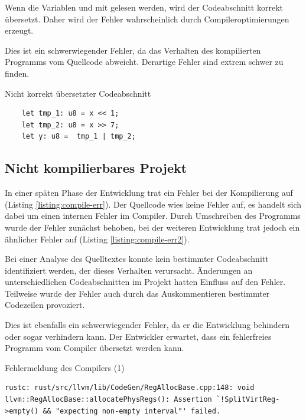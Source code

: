 \documentclass
[ 12pt,
  parskip=half %
]{scrreprt}
\newenvironment{mylisting}[1][H]
{\captionsetup{aboveskip=-0.2\normalbaselineskip}\begin{listing}[#1]}
{\end{listing}}
\begin{document}
Wenn die Variablen  und  mit  gelesen werden, wird der Codeabschnitt korrekt übersetzt. Daher wird der Fehler wahrscheinlich durch Compileroptimierungen erzeugt.

Dies ist ein schwerwiegender Fehler, da das Verhalten des kompilierten Programms vom Quellcode abweicht. Derartige Fehler sind extrem schwer zu finden.

\begin{mylisting}
	\caption{Nicht korrekt übersetzter Codeabschnitt}
	\label{listing:err-bitrotation}
	\begin{verbatim}
	let tmp_1: u8 = x << 1;
	let tmp_2: u8 = x >> 7;
	let y: u8 =  tmp_1 | tmp_2;
	\end{verbatim}
\end{mylisting} 

\subsection{Nicht kompilierbares Projekt}

In einer späten Phase der Entwicklung trat ein Fehler bei der Kompilierung auf (Listing \ref{listing:compile-err}). Der Quellcode wies keine Fehler auf, es handelt sich dabei um einen internen Fehler im Compiler. Durch Umschreiben des Programms wurde der Fehler zunächst behoben, bei der weiteren Entwicklung trat jedoch ein ähnlicher Fehler auf (Listing \ref{listing:compile-err2}).
 
Bei einer Analyse des Quelltextes konnte kein bestimmter Codeabschnitt identifiziert werden, der dieses Verhalten verursacht. Änderungen an unterschiedlichen Codeabschnitten im Projekt hatten Einfluss auf den Fehler.
Teilweise wurde der Fehler auch durch das Auskommentieren bestimmter Codezeilen provoziert. 

Dies ist ebenfalls ein schwerwiegender Fehler, da er die Entwicklung behindern oder sogar verhindern kann. Der Entwickler erwartet, dass ein fehlerfreies Programm vom Compiler übersetzt werden kann. 

\begin{mylisting}
	\caption{Fehlermeldung des Compilers (1)}
	\label{listing:compile-err}
	\begin{verbatim}
rustc: rust/src/llvm/lib/CodeGen/RegAllocBase.cpp:148: void llvm::RegAllocBase::allocatePhysRegs(): Assertion `!SplitVirtReg->empty() && "expecting non-empty interval"' failed.
	\end{verbatim}
\end{mylisting} 
\end{document}
